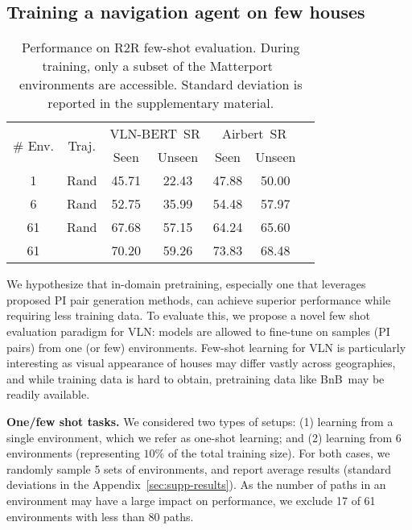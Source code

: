 \RequirePackage[dvipsnames,table]{xcolor} \documentclass[10pt,twocolumn,letterpaper]{article}
\newcommand{\p}[1]{\vspace{1mm}\noindent\textbf{#1}}
\newcommand{\vlnbert}{VLN-BERT}
\newcommand{\airbert}{Airbert}
\newcommand{\airbnb}{BnB}
\begin{document}
\subsection{Training a navigation agent on few houses}
\label{sec:eval:fsl}
\begin{table}[t]
\centering
\small
\tabcolsep=0.14cm
\begin{tabular}{ccc cc cc}
\toprule
\multirow{2}{*}{\# Env.} &
\multirow{2}{*}{Traj.} & 
\multicolumn{2}{c}{\vlnbert~SR} &
\multicolumn{2}{c}{\airbert~SR}\\ 
& & Seen & Unseen & Seen & Unseen \\ 
\midrule
1  & Rand 
    & 45.71 & 22.43
    & 47.88 & 50.00 \\
\midrule
6  & Rand
    & 52.75 & 35.99
    & 54.48 & 57.97 \\
\midrule
61 & Rand
    & 67.68 & 57.15
    & 64.24 & 65.60 \\
61 & \cite{tan2019envdrop}
    & 70.20 & 59.26
    & 73.83 & 68.48 \\
\bottomrule
\end{tabular}
\vspace{-2mm}
\caption{Performance on R2R few-shot evaluation.
During training, only a subset of the Matterport~\cite{Matterport3D} environments are accessible.
Standard deviation is reported in the supplementary material.}
\vspace{-4mm}
\label{tab:fsl}
\end{table}



%
 
We hypothesize that in-domain pretraining, especially one that leverages proposed PI pair generation methods, can achieve superior performance while requiring less training data.
To evaluate this, we propose a novel few shot evaluation paradigm for VLN: models are allowed to fine-tune on samples (PI pairs) from one (or few) environments.
Few-shot learning for VLN is particularly interesting as visual appearance of houses may differ vastly across geographies, and while training data is hard to obtain, pretraining data like \airbnb~may be readily available.



\p{One/few shot tasks.}
We considered two types of setups:
(1) learning from a single environment, which we refer as one-shot learning; and
(2) learning from 6 environments (representing $10\%$ of the total training size).
For both cases, we randomly sample 5 sets of environments, and report average results (standard deviations in the Appendix~\ref{sec:supp-results}).
As the number of paths in an environment may have a large impact on performance, we exclude 17 of 61 environments with less than 80 paths.
\end{document}
